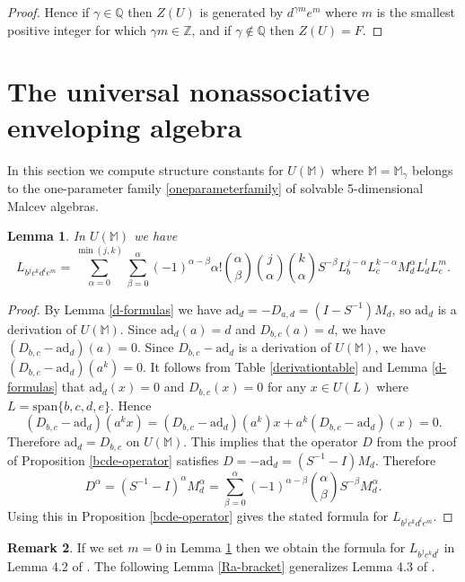 \documentclass{amsart}
\theoremstyle{plain}
\newtheorem{lemma}{Lemma}[section]
\theoremstyle{definition}
\newtheorem{remark}[lemma]{Remark}
\begin{document}
\begin{proof}
Hence if $\gamma \in \mathbb{Q}$ then $Z(U)$ is generated by $d^{\gamma m} e^m$
where $m$ is the smallest positive integer for which $\gamma m \in \mathbb{Z}$,
and if $\gamma \notin \mathbb{Q}$ then $Z(U) = F$.
\end{proof}


\section{The universal nonassociative enveloping algebra}

In this section we compute structure constants for $U(\mathbb{M})$ where
$\mathbb{M} = \mathbb{M}_\gamma$ belongs to the one-parameter family
\eqref{oneparameterfamily} of solvable 5-dimensional Malcev algebras.

\begin{lemma} \label{bcde-operatorforM}
In $U(\mathbb{M})$ we have
  \[
  L_{b^j c^k d^l e^m} = \sum_{\alpha=0}^{\min(j,k)}
  \sum^{\alpha}_{\beta=0} (-1)^{\alpha-\beta} \alpha!
  \binom{\alpha}{\beta} \binom{j} {\alpha} \binom{k}{\alpha}
  S^{-\beta} L^{j-\alpha}_b L^{k-\alpha}_c M^{\alpha}_d L^l_d L^m_e.
  \]
\end{lemma}

\begin{proof}
By Lemma \ref{d-formulas} we have $\mathrm{ad}_d = -D_{a,d} = (I-S^{-1})M_d$,
so $\mathrm{ad}_d$ is a derivation of $U(\mathbb{M})$. Since $\mathrm{ad}_d(a)
= d$ and $D_{b,c}(a) = d$, we have $(D_{b,c} - \mathrm{ad}_d)(a) = 0$. Since
$D_{b,c} - \mathrm{ad}_d$ is a derivation of $U(\mathbb{M})$, we have $(D_{b,c}
- \mathrm{ad}_d)(a^k) = 0$. It follows from Table \ref{derivationtable} and
Lemma \ref{d-formulas} that $\mathrm{ad}_d(x)= 0$ and $D_{b,c}(x) = 0$ for any
$x \in U(L)$ where $L = \mathrm{span}\{b, c, d, e\}$. Hence
  \[
  (D_{b,c} - \mathrm{ad}_d) (a^k x)
  =
  (D_{b,c} - \mathrm{ad}_d)(a^k) x
  +
  a^k (D_{b,c} - \mathrm{ad}_d)(x)
  =
  0.
  \]
Therefore $\mathrm{ad}_d = D_{b,c}$ on $U(\mathbb{M})$. This implies that the
operator $D$ from the proof of Proposition \ref{bcde-operator} satisfies $D =
-\mathrm{ad}_d = (S^{-1}-I) M_d$.  Therefore
  \[
  D^{\alpha}
  =
  (S^{-1} - I)^{\alpha} M^{\alpha}_d
  =
  \sum^{\alpha}_{\beta=0}
  (-1)^{\alpha-\beta}
  \binom{\alpha}{\beta}
  S^{-\beta}
  M^{\alpha}_d.
  \]
Using this in Proposition \ref{bcde-operator} gives the stated formula for
$L_{b^j c^k d^l e^m}$.
\end{proof}

\begin{remark}
If we set $m = 0$ in Lemma \ref{bcde-operatorforM} then we obtain the formula
for $L_{b^j c^k d^l}$ in Lemma 4.2 of \cite{BHPU}. The following Lemma
\ref{Ra-bracket} generalizes Lemma 4.3 of \cite{BHPU}.
\end{remark}
\end{document}
